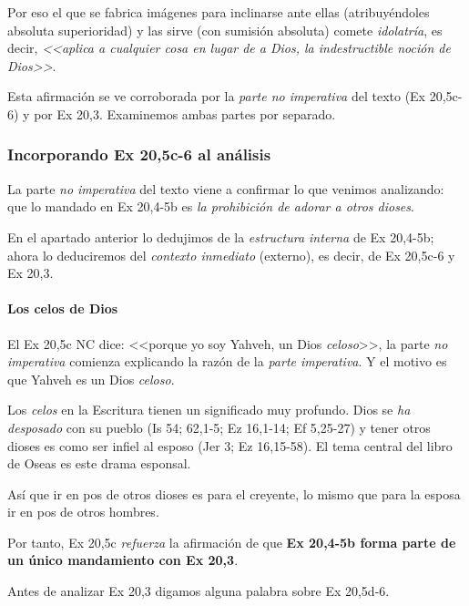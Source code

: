 \documentclass{article}
\begin{document}
Por eso el que se fabrica im\'agenes para inclinarse ante ellas (atribuy\'endoles absoluta superioridad) y las sirve (con sumisi\'on absoluta) comete \emph{idolatr\'{i}a}, es decir, \emph{<<aplica a cualquier cosa en lugar de a Dios, la indestructible noci\'on de Dios>>}.

Esta afirmaci\'on se ve corroborada por la \emph{parte no imperativa} del texto (Ex 20,5c-6) y por Ex 20,3. Examinemos ambas partes por separado.

\subsubsection{Incorporando Ex 20,5c-6 al an\'alisis}

La parte \emph{no imperativa} del texto viene a confirmar lo que venimos analizando: que lo mandado en Ex 20,4-5b es \emph{la prohibici\'on de adorar a otros dioses}.

En el apartado anterior lo dedujimos de la \emph{estructura interna} de Ex 20,4-5b; ahora lo deduciremos del \emph{contexto inmediato} (externo), es decir, de Ex 20,5c-6 y Ex 20,3.

\paragraph{Los celos de Dios}

El Ex 20,5c NC dice: <<porque yo soy Yahveh, un Dios \emph{celoso}>>, la parte \emph{no imperativa} comienza explicando la raz\'on de la \emph{parte imperativa}. Y el motivo es que Yahveh es un Dios \emph{celoso}.

Los \emph{celos} en la Escritura tienen un significado muy profundo. Dios se \emph{ha desposado} con su pueblo (Is 54; 62,1-5; Ez 16,1-14; Ef 5,25-27) y tener otros dioses es como ser infiel al esposo (Jer 3; Ez 16,15-58). El tema central del libro de Oseas es este drama esponsal.

As\'{i} que ir en pos de otros dioses es para el creyente, lo mismo que para la esposa ir en pos de otros hombres.%

Por tanto, Ex 20,5c \emph{refuerza} la afirmaci\'on de que \textbf{Ex 20,4-5b forma parte de un \'unico mandamiento con Ex 20,3}.

Antes de analizar Ex 20,3 digamos alguna palabra sobre Ex 20,5d-6.
\end{document}
